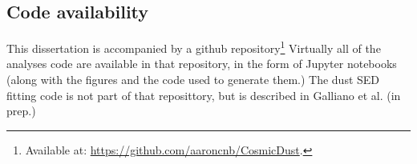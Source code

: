   \subsection{Code availability}
    This dissertation is accompanied by a github repository\footnote{Available at: \url{https://github.com/aaroncnb/CosmicDust}.} Virtually all of the analyses code are available in that repository, in the form of Jupyter notebooks (along with the figures and the code used to generate them.) The dust SED fitting code is not part of that reposittory, but is described in Galliano et al. (in prep.)
